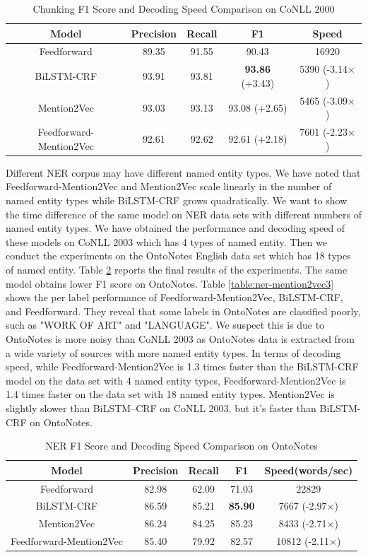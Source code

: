 \begin{table}[]
\centering
\caption{Chunking F1 Score and Decoding Speed Comparison on CoNLL 2000}
\label{table:chunk-mention2vec1}
\begin{tabular}{|c|c|c|c|c|}
\hline
Model   & Precision & Recall & F1 & Speed \\ \hline
Feedforward & 89.35 &91.55 &90.43 & 16920 \\ \hline
BiLSTM-CRF &93.91 &93.81 &\textbf{93.86} (+3.43) & 5390 (-3.14$\times$) \\ \hline
Mention2Vec &93.03 & 93.13 &93.08 (+2.65) & 5465 (-3.09$\times$) \\ \hline
Feedforward-Mention2Vec &92.61 & 92.62 &92.61 (+2.18) & 7601 (-2.23$\times$) \\ \hline
\end{tabular}
\end{table}


Different NER corpus may have different named entity types. We have noted that Feedforward-Mention2Vec and Mention2Vec scale linearly in the number of named entity types while BiLSTM-CRF grows quadratically. We want to show the time difference of the same model on NER data sets with different numbers of named entity types. We have obtained the performance and decoding speed of these models on CoNLL 2003 which has 4 types of named entity. Then we conduct the experiments on the OntoNotes English data set which has 18 types of named entity. Table \ref{table:ner-mention2vec2} reports the final results of the experiments. The same model obtains lower F1 score on OntoNotes. Table \ref{table:ner-mention2vec3} shows the per label performance of Feedforward-Mention2Vec, BiLSTM-CRF, and Feedforward. They reveal that some labels in OntoNotes are classified poorly, such as "WORK OF ART" and "LANGUAGE". We suspect this is due to OntoNotes is more noisy than CoNLL 2003 as OntoNotes data is extracted from a wide variety of sources with more named entity types. In terms of decoding speed, while Feedforward-Mention2Vec is 1.3 times faster than the BiLSTM-CRF model on the data set with 4 named entity types, Feedforward-Mention2Vec is 1.4 times faster on the data set with 18 named entity types. Mention2Vec is slightly slower than BiLSTM--CRF on CoNLL 2003, but it's faster than BiLSTM-CRF on OntoNotes.

\begin{table}[]
\centering
\caption{NER F1 Score and Decoding Speed Comparison on OntoNotes}
\label{table:ner-mention2vec2}
\begin{tabular}{|c|c|c|c|c|}
\hline
Model & Precision & Recall & F1 & Speed(words/sec) \\ \hline
Feedforward  & 82.98 & 62.09 & 71.03 & 22829 \\ \hline
BiLSTM-CRF &86.59 &85.21 &\textbf{85.90} & 7667 (-2.97$\times$)
  \\ \hline
Mention2Vec & 86.24 & 84.25 & 85.23 & 8433 (-2.71$\times$)
         \\ \hline
Feedforward-Mention2Vec & 85.40 & 79.92 & 82.57 & 10812 (-2.11$\times$) \\ \hline
\end{tabular}
\end{table}

